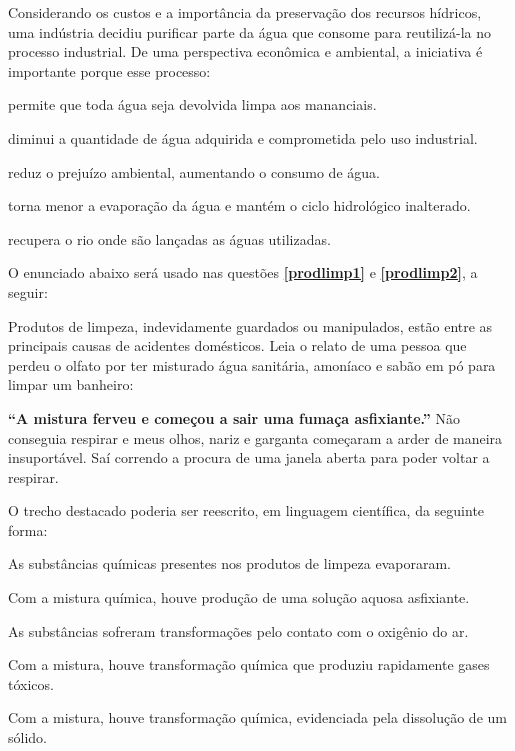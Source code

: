 \questao
Considerando os custos e a importância da preservação dos recursos hídricos, uma indústria decidiu purificar parte da água que consome para reutilizá-la no processo industrial. De uma perspectiva econômica e ambiental, a iniciativa é importante porque esse processo:
\begin{alternativas}
\item permite que toda água seja devolvida limpa aos mananciais.
\item diminui a quantidade de água adquirida e comprometida pelo uso industrial.
\item reduz o prejuízo ambiental, aumentando o consumo de água.
\item torna menor a evaporação da água e mantém o ciclo hidrológico inalterado.
\item recupera o rio onde são lançadas as águas utilizadas.
\end{alternativas}

\separador

\noindent O enunciado abaixo será usado nas questões \textbf{\ref{prodlimp1}} e \textbf{\ref{prodlimp2}}, a seguir:

Produtos de limpeza, indevidamente guardados ou manipulados, estão entre as principais causas de acidentes domésticos. Leia o relato de uma pessoa que perdeu o olfato por ter misturado água sanitária, amoníaco e sabão em pó para limpar um banheiro:

\textbf{``A mistura ferveu e começou a sair uma fumaça asfixiante.''} Não conseguia respirar e meus olhos, nariz e garganta começaram a arder de maneira insuportável. Saí correndo a procura de uma janela aberta para poder voltar a respirar.

\medskip
\questao\label{prodlimp1}
O trecho destacado poderia ser reescrito, em linguagem científica, da seguinte forma:
\begin{alternativas}
\item As substâncias químicas presentes nos produtos de limpeza evaporaram.
\item Com a mistura química, houve produção de uma solução aquosa asfixiante.
\item As substâncias sofreram transformações pelo contato com o oxigênio do ar.
\item Com a mistura, houve transformação química que produziu rapidamente gases tóxicos.
\item Com a mistura, houve transformação química, evidenciada pela dissolução de um sólido.
\end{alternativas}

